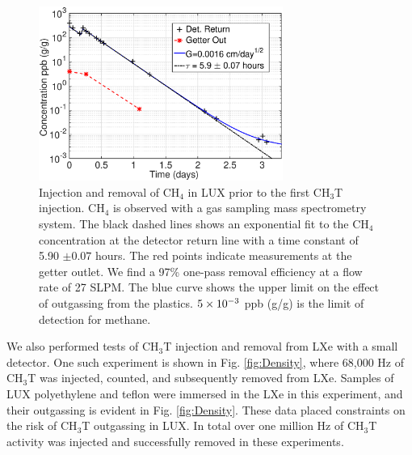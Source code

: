 \begin{figure}[h!]\centering
\includegraphics[width=80mm]{fig/July_CH4_wOG.eps}
\caption{Injection and removal of CH$_4$ in LUX prior to the first CH$_3$T injection. CH$_4$ is observed with a gas sampling mass spectrometry system. The black dashed lines shows an exponential fit to the CH$_4$ concentration at the detector return line with a time constant of 5.90 $\pm 0.07$ hours.  The red points indicate measurements at the getter outlet. We find a 97\% one-pass removal efficiency at a flow rate of 27 SLPM. The blue curve shows the upper limit on the effect of outgassing from the plastics. $\rm 5\times10^{-3}$ ppb (g/g) is the limit of detection for methane.}
\label{fig:ch4_removal}
\end{figure}

We also performed tests of CH$_3$T injection and removal from LXe with a small detector. One such experiment is shown in Fig. \ref{fig:Density}, where 68,000 Hz of CH$_3$T was injected, counted, and subsequently removed from LXe. Samples of LUX polyethylene and teflon were immersed in the LXe in this experiment, and their outgassing is evident in Fig. \ref{fig:Density}. These data placed constraints on the risk of CH$_3$T outgassing in LUX. In total over one million Hz of CH$_3$T activity was injected and successfully removed in these experiments.

